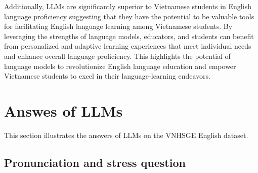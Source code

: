 \documentclass[11pt]{article}
\begin{document}
Additionally, LLMs are significantly superior to Vietnamese students in English language proficiency suggesting that they have the potential to be valuable tools for facilitating English language learning among Vietnamese students. By leveraging the strengths of language models, educators, and students can benefit from personalized and adaptive learning experiences that meet individual needs and enhance overall language proficiency. This highlights the potential of language models to revolutionize English language education and empower Vietnamese students to excel in their language-learning endeavors.




\appendix

\section{Answes of LLMs}
\label{sec:llm_a_appendix}

This section illustrates the answers of LLMs on the VNHSGE English dataset. 

\subsection{Pronunciation and stress question}
\end{document}
